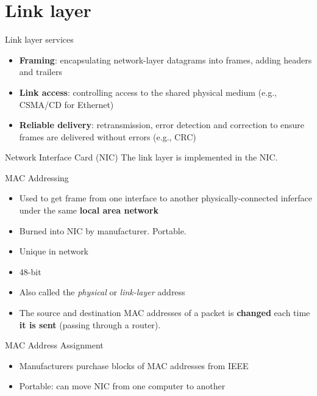 \section{Link layer}

\begin{knBox}
    {Link layer services}
    \begin{itemize}
        \item \textbf{Framing}: encapsulating network-layer datagrams into frames, adding headers and trailers
        \item \textbf{Link access}: controlling access to the shared physical medium (e.g., CSMA/CD for Ethernet)
        \item \textbf{Reliable delivery}: retransmission, error detection and correction to ensure frames are delivered without errors (e.g., CRC)
    \end{itemize}
\end{knBox}

\begin{knBox}
    {Network Interface Card (NIC)}
    The link layer is implemented in the NIC.
\end{knBox}

\begin{definition}
    {MAC Addressing}
    \begin{itemize}
        \item Used to get frame from one interface to another physically-connected inferface under the same \textbf{local area network}
        \item Burned into NIC by manufacturer. Portable.
        \item Unique in network
        \item 48-bit
        \item Also called the \textit{physical} or \textit{link-layer} address
    \end{itemize}
    \begin{itemize}
        \item The source and destination MAC addresses of a packet is \textbf{changed} each time \textbf{it is sent} (passing through a router).
    \end{itemize}
\end{definition}

\begin{knBox}
    {MAC Address Assignment}
    \begin{itemize}
        \item Manufacturers purchase blocks of MAC addresses from IEEE
        \item Portable: can move NIC from one computer to another
    \end{itemize}
\end{knBox}

